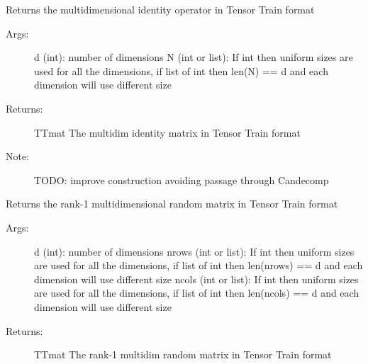 \documentclass[a4paper,10pt,english]{sphinxmanual}
\begin{document}

\begin{fulllineitems}
\label{api-core:TensorToolbox.core.eye}
Returns the multidimensional identity operator in Tensor Train format
\begin{description}
\item[{Args:}] \leavevmode
d (int): number of dimensions
N (int or list): If int then uniform sizes are used for all the dimensions, if list of int then len(N) == d and each dimension will use different size

\item[{Returns:}] \leavevmode
TTmat The multidim identity matrix in Tensor Train format

\item[{Note:}] \leavevmode
TODO: improve construction avoiding passage through Candecomp

\end{description}

\end{fulllineitems}


\begin{fulllineitems}
\label{api-core:TensorToolbox.core.randmat}
Returns the rank-1 multidimensional random matrix in Tensor Train format
\begin{description}
\item[{Args:}] \leavevmode
d (int): number of dimensions
nrows (int or list): If int then uniform sizes are used for all the dimensions, if list of int then len(nrows) == d and each dimension will use different size
ncols (int or list): If int then uniform sizes are used for all the dimensions, if list of int then len(ncols) == d and each dimension will use different size

\item[{Returns:}] \leavevmode
TTmat The rank-1 multidim random matrix in Tensor Train format

\end{description}

\end{fulllineitems}

\end{document}

